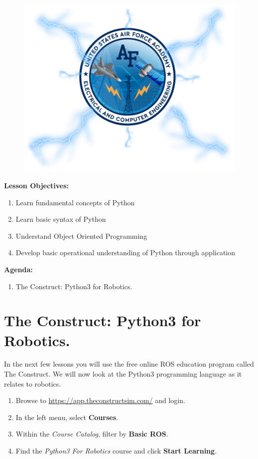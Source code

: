 \documentclass{handout}
\begin{document}
\maketitle

\begin{figure}[H]
	\centering
	\includegraphics[width=.75\textwidth]{Cover.PNG}
\end{figure}

\textbf{Lesson Objectives:}
\begin{enumerate} \setlength\itemsep{0em}
	\item Learn fundamental concepts of Python
	\item Learn basic syntax of Python
	\item Understand Object Oriented Programming
	\item Develop basic operational understanding of Python through application
\end{enumerate}

\textbf{Agenda:}
\begin{enumerate} \setlength\itemsep{0em}
	\item The Construct: Python3 for Robotics.
\end{enumerate}

\newpage
\clearpage
\pagebreak

\section{The Construct: Python3 for Robotics.}
In the next few lessons you will use the free online ROS education program called The Construct. We will now look at the Python3 programming language as it relates to robotics.

\begin{enumerate}
	\item Browse to \url{https://app.theconstructsim.com/} and login.
	\item In the left menu, select \textbf{Courses}.
	\item Within the \textit{Course Catalog}, filter by \textbf{Basic ROS}.
	\item Find the \textit{Python3 For Robotics} course and click \textbf{Start Learning}.
\end{enumerate}
\end{document}
